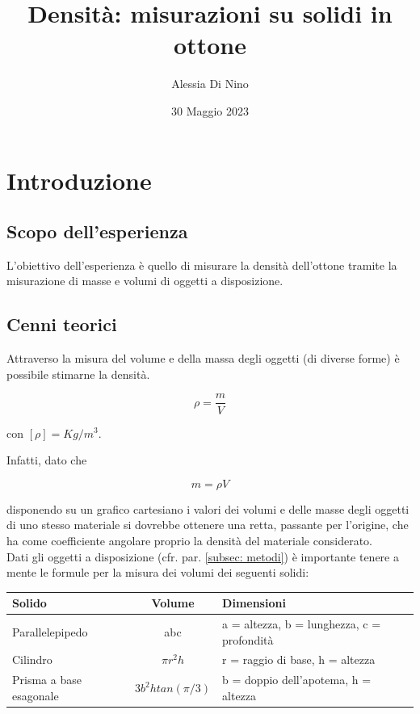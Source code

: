 \documentclass{article}
\begin{document}
\title{Densità: misurazioni su solidi in ottone}
\author{Alessia Di Nino}
\date{30 Maggio 2023}
\maketitle

\section{Introduzione}
\subsection{Scopo dell'esperienza} %
L'obiettivo dell'esperienza è quello di misurare la densità dell'ottone tramite la misurazione di masse e volumi di oggetti a disposizione. 
\subsection{Cenni teorici} %
Attraverso la misura del volume e della massa degli oggetti (di diverse forme) è possibile stimarne la densità. 

\begin{equation}
    \rho = \frac{m}{V}
\end{equation}

con $[\rho] = Kg/m^3$.

Infatti, dato che

\begin{equation}
    m = \rho V
\end{equation}

disponendo su un grafico cartesiano i valori dei volumi e delle masse degli oggetti di uno stesso materiale si dovrebbe ottenere una retta, passante per l'origine, che ha come coefficiente angolare proprio la densità del materiale considerato.\\ 
Dati gli oggetti a disposizione (cfr. par. \ref{subsec: metodi}) è importante tenere a mente le formule per la misura dei volumi dei seguenti solidi:

\begin{tabular}{lcl}
     \toprule
     Solido & Volume & Dimensioni\\
     \midrule
     Parallelepipedo & abc & a = altezza, b = lunghezza, c = profondità\\
     Cilindro & $\pi r^2h$ & r = raggio di base, h = altezza\\
     Prisma a base esagonale & $3b^2htan(\pi/3)$ & b = doppio dell'apotema, h = altezza\\
     \bottomrule
\end{tabular}
\end{document}
